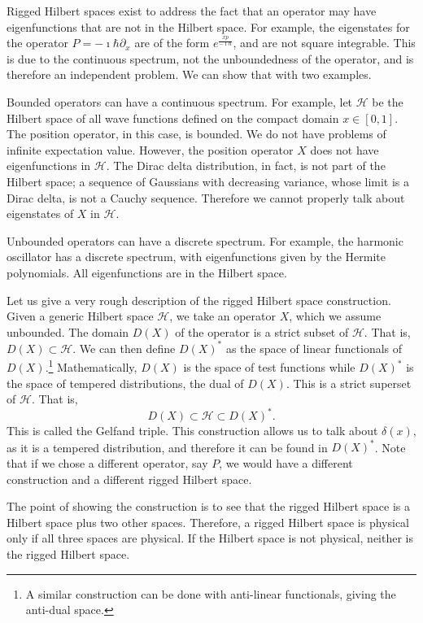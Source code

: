 \documentclass[10pt,twocolumn, nofootinbib]{revtex4-2}
\begin{document}
Rigged Hilbert spaces exist to address the fact that an operator may have eigenfunctions that are not in the Hilbert space. For example, the eigenstates for the operator $P = - \imath \hbar \partial_x$ are of the form $e^{\frac{xp}{-\imath\hbar}}$, and are not square integrable. This is due to the continuous spectrum, not the unboundedness of the operator, and is therefore an independent problem. We can show that with two examples.

Bounded operators can have a continuous spectrum. For example, let $\mathcal{H}$ be the Hilbert space of all wave functions defined on the compact domain $x \in [0,1]$. The position operator, in this case, is bounded. We do not have problems of infinite expectation value. However, the position operator $X$ does not have eigenfunctions in $\mathcal{H}$. The Dirac delta distribution, in fact, is not part of the Hilbert space; a sequence of Gaussians with decreasing variance, whose limit is a Dirac delta, is not a Cauchy sequence. Therefore we cannot properly talk about eigenstates of $X$ in $\mathcal{H}$.

Unbounded operators can have a discrete spectrum. For example, the harmonic oscillator has a discrete spectrum, with eigenfunctions given by the Hermite polynomials. All eigenfunctions are in the Hilbert space.

Let us give a very rough description of the rigged Hilbert space construction. Given a generic Hilbert space $\mathcal{H}$, we take an operator $X$, which we assume unbounded. The domain $D(X)$ of the operator is a strict subset of $\mathcal{H}$. That is, $D(X) \subset \mathcal{H}$. We can then define $D(X)^*$ as the space of linear functionals of $D(X)$.\footnote{A similar construction can be done with anti-linear functionals, giving the anti-dual space.} Mathematically, $D(X)$ is the space of test functions while $D(X)^*$ is the space of tempered distributions, the dual of $D(X)$. This is a strict superset of $\mathcal{H}$. That is,
\begin{equation}
	D(X) \subset \mathcal{H} \subset D(X)^*.
\end{equation}
This is called the Gelfand triple. This construction allows us to talk about $\delta(x)$, as it is a tempered distribution, and therefore it can be found in $D(X)^*$. Note that if we chose a different operator, say $P$, we would have a different construction and a different rigged Hilbert space.

The point of showing the construction is to see that the rigged Hilbert space is a Hilbert space plus two other spaces. Therefore, a rigged Hilbert space is physical only if all three spaces are physical. If the Hilbert space is not physical, neither is the rigged Hilbert space.
\end{document}
